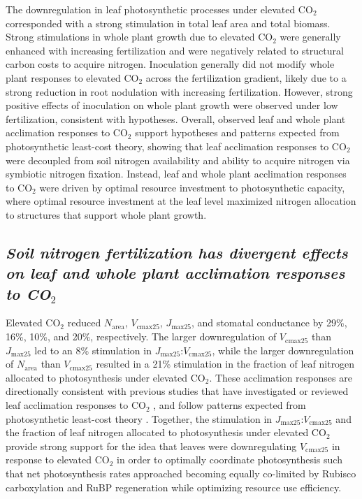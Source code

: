 The downregulation in leaf photosynthetic processes under elevated CO$_2$ corresponded with a strong stimulation in total leaf area and total biomass. Strong stimulations in whole plant growth due to elevated CO$_2$ were generally enhanced with increasing fertilization and were negatively related to structural carbon costs to acquire nitrogen. Inoculation generally did not modify whole plant responses to elevated CO$_2$ across the fertilization gradient, likely due to a strong reduction in root nodulation with increasing fertilization. However, strong positive effects of inoculation on whole plant growth were observed under low fertilization, consistent with hypotheses. Overall, observed leaf and whole plant acclimation responses to CO$_2$ support hypotheses and patterns expected from photosynthetic least-cost theory, showing that leaf acclimation responses to CO$_2$ were decoupled from soil nitrogen availability and ability to acquire nitrogen via symbiotic nitrogen fixation. Instead, leaf and whole plant acclimation responses to CO$_2$ were driven by optimal resource investment to photosynthetic capacity, where optimal resource investment at the leaf level maximized nitrogen allocation to structures that support whole plant growth.

\begin{singlespace}
    \subsection{\textit{Soil nitrogen fertilization has divergent effects on leaf and whole plant acclimation responses to CO$_2$}}
\end{singlespace}
\noindent Elevated CO$_2$ reduced $N_\mathrm{area}$, $V_\mathrm{cmax25}$, $J_\mathrm{max25}$, and stomatal conductance by 29\%, 16\%, 10\%, and 20\%, respectively. The larger downregulation of $V_\mathrm{cmax25}$ than $J_\mathrm{max25}$ led to an 8\% stimulation in $J_\mathrm{max25}$:$V_\mathrm{cmax25}$, while the larger downregulation of $N_\mathrm{area}$ than $V_\mathrm{cmax25}$ resulted in a 21\% stimulation in the fraction of leaf nitrogen allocated to photosynthesis under elevated CO$_2$. These acclimation responses are directionally consistent with previous studies that have investigated or reviewed leaf acclimation responses to CO$_2$ , and follow patterns expected from photosynthetic least-cost theory . Together, the stimulation in $J_\mathrm{max25}$:$V_\mathrm{cmax25}$ and the fraction of leaf nitrogen allocated to photosynthesis under elevated CO$_2$ provide strong support for the idea that leaves were downregulating $V_\mathrm{cmax25}$ in response to elevated CO$_2$ in order to optimally coordinate photosynthesis such that net photosynthesis rates approached becoming equally co-limited by Rubisco carboxylation and RuBP regeneration  while optimizing resource use efficiency.

